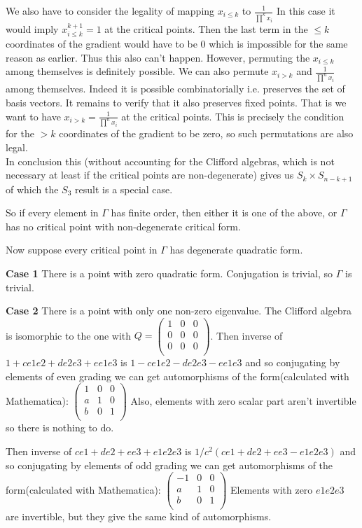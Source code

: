 \documentclass[a4paper]{article}
\begin{document}
We also have to consider the legality of mapping $x_{i\le k}$ to $\frac{1}{\prod^k x_{i}}$ In this case it would imply $x_{i\le k}^{k+1}=1$ at the critical points. Then the last term in the $\le k$ coordinates of the gradient would have to be 0 which is impossible for the same reason as earlier. Thus this also can't happen.
However, permuting the $x_{i\le k}$ among themselves is definitely possible. We can also permute $x_{i>k}$ and $\frac{1}{\prod^{n}x_{i}}$ among themselves. Indeed it is possible combinatorially i.e. preserves the set of basis vectors. It remains to verify that it also preserves fixed points. 
That is we want to have $x_{i>k}=\frac{1}{\prod^{n}x_{i}}$ at the critical points. This is precisely the condition for the $>k$ coordinates of the gradient to be zero, so such permutations are also legal.\\
In conclusion this (without accounting for the Clifford algebras, which is not necessary at least if the critical points are non-degenerate) gives us $S_{k}\times S_{n-k+1}$ of which the $S_3$ result is a special case.


So if every element in $\Gamma$ has finite order, then either it is one of the above, or $\Gamma$ has no critical point with non-degenerate critical form.

Now suppose every critical point in $\Gamma$ has degenerate quadratic form.


\textbf{Case 1} There is a point with zero quadratic form.
Conjugation is trivial, so $\Gamma$ is trivial.

\textbf{Case 2} There is a point with only one non-zero eigenvalue.
The Clifford algebra is isomorphic to the one with $Q= \begin{pmatrix}
	1 & 0 &0 \\ 
	0 & 0 &0\\
	0 & 0 &0\\
\end{pmatrix}$.
Then inverse of $1+c e1e2+d e2e3+ e e1e3$ is $1-c e1e2-d e2e3- e e1e3$ and so conjugating by elements of even grading we can get automorphisms of the form(calculated with Mathematica):
$ \begin{pmatrix}
1 & 0 &0 \\ 
a & 1 & 0\\
b & 0 &  1\\
\end{pmatrix}$
Also, elements with zero scalar part aren't invertible so there is nothing to do.

Then inverse of $ce1+de2+ e e3+ e1e2e3$ is $1/c^2(ce1+de2+ e e3- e1e2e3)$ and so conjugating by elements of odd grading we can get automorphisms of the form(calculated with Mathematica):
$ \begin{pmatrix}
-1 & 0 &0 \\ 
a & 1 & 0\\
b & 0 &  1\\
\end{pmatrix}$
Elements with zero $e1e2e3$ are invertible, but they give the same kind of automorphisms.
\end{document}
